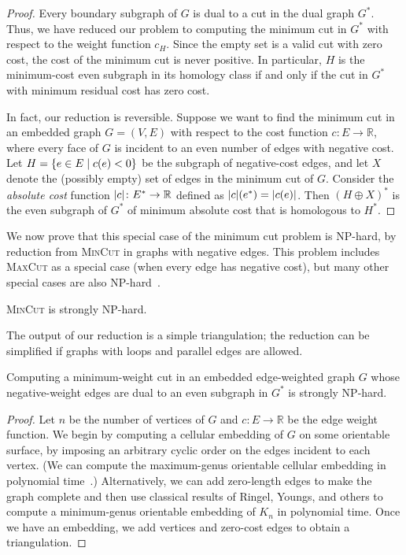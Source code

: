 \documentclass[letterpaper,review]{siamart190516}
\def\Real{\mathbb{R}}
\begin{document}
{\begin{proof}
Every boundary subgraph of $G$ is dual to a cut in the dual graph $G^*$.  Thus, we have reduced our problem to computing the minimum cut in $G^*$ with respect to the weight function $c_H$.  Since the empty set is a valid cut with zero cost, the cost of the minimum cut is never positive.  In particular, $H$ is the minimum-cost even subgraph in its homology class if and only if the cut in $G^*$ with minimum residual cost has zero cost.

In fact, our reduction is reversible.  Suppose we want to find the minimum cut in an embedded graph $G = (V, E)$ with respect to the cost function $c\colon E\to \Real$, where every face of $G$ is incident to an even number of edges with negative cost.  Let $H = \{ {e\in E}\mid {c(e)<0} \}$ be the subgraph of negative-cost edges, and let $X$ denote the (possibly empty) set of edges in the minimum cut of $G$.  Consider the \emph{absolute cost} function $\abs{c}\colon E^*\to \Real$ defined as $\mathopen| c \mathclose|(e^*) = \mathopen| c(e) \mathclose|$.  Then $(H\oplus X)^*$ is the even subgraph of $G^*$ of minimum absolute cost that is homologous to $H^*$.
\end{proof}


We now prove that this special case of the minimum cut problem is {NP}-hard, by  reduction from \textsc{MinCut} in graphs with negative edges.  This problem includes \textsc{MaxCut} as a special case (when every edge has negative cost), but many other special cases are also {NP}-hard~\cite{mrr-edofm-03}.

\begin{lemma}
\textsc{MinCut} is strongly NP-hard.
\end{lemma}

The output of our reduction is a simple triangulation; the reduction can be simplified if graphs with loops and parallel edges are allowed.

\begin{lemma}
Computing a minimum-weight cut in an embedded edge-weighted graph $G$ whose negative-weight edges are dual to an even subgraph in $G^*$
is strongly NP-hard.
\end{lemma}
\begin{proof}
Let $n$ be the number of vertices of $G$ and $c\colon E\to \Real$ be the edge weight function.  We begin by computing a cellular embedding of $G$ on some orientable surface, by imposing an arbitrary cyclic order on the edges incident to each vertex.
(We can compute the maximum-genus orientable cellular embedding  in polynomial time~\cite{fgm-fmggi-88}.)  Alternatively, we can add zero-length edges to make the graph complete and then use classical results of Ringel, Youngs, and others \cite{ry-shmcp-68,r-mct-74} to compute a minimum-genus orientable embedding of $K_n$ in polynomial time.  Once we have an embedding, we add vertices and zero-cost edges to obtain a triangulation.


\end{proof}}
\end{document}
